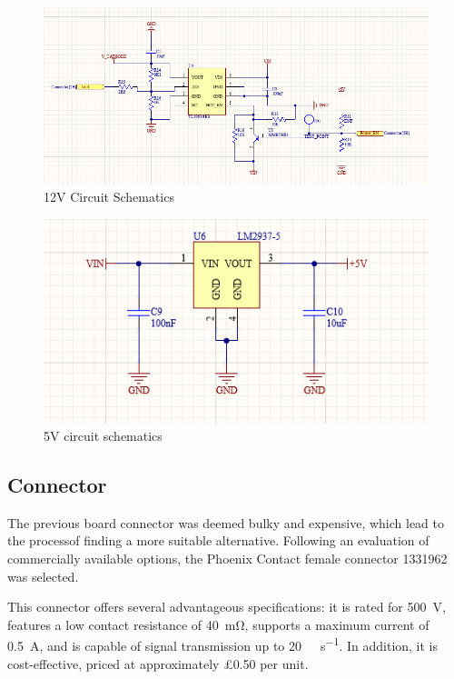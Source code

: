 \documentclass[a4paper,11pt]{article}
\begin{document}
\begin{figure}[htbp]
\centering
\includegraphics[scale=0.5]{12VVariablePSU.png}
\caption{12V Circuit Schematics\label{fig:12VVariablePSU}}
\end{figure}

\begin{figure}[htbp]
\centering
\includegraphics[scale=0.5]{5VCircuit.png}
\caption{5V circuit schematics\label{fig:5VCircuit}}
\end{figure}

\subsection{Connector}

The previous board connector was deemed bulky and expensive, which lead to the processof finding a more suitable alternative. Following an evaluation of commercially available options, the Phoenix Contact female connector 1331962 \cite{1331962} was selected.

This connector offers several advantageous specifications: it is rated for \SI{500}{\volt}, features a low contact resistance of \SI{40}{\milli\ohm}, supports a maximum current of \SI{0.5}{\ampere}, and is capable of signal transmission up to \SI{20}{\giga\bit\per\second}. In addition, it is cost-effective, priced at approximately \pounds 0.50 per unit.
\end{document}
